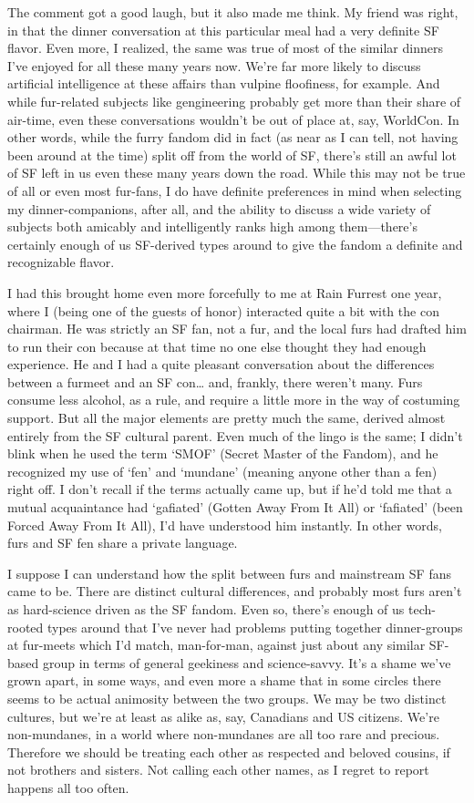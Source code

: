 The comment got a good laugh, but it also made me think. My friend was right, in that the dinner conversation at this particular meal had a very definite SF flavor. Even more, I realized, the same was true of most of the similar dinners I've enjoyed for all these many years now. We're far more likely to discuss artificial intelligence at these affairs than vulpine floofiness, for example. And while fur-related subjects like gengineering probably get more than their share of air-time, even these conversations wouldn't be out of place at, say, WorldCon. In other words, while the furry fandom did in fact (as near as I can tell, not having been around at the time) split off from the world of SF, there's still an awful lot of SF left in us even these many years down the road. While this may not be true of all or even most fur-fans, I do have definite preferences in mind when selecting my dinner-companions, after all, and the ability to discuss a wide variety of subjects both amicably and intelligently ranks high among them—there's certainly enough of us SF-derived types around to give the fandom a definite and recognizable flavor.

I had this brought home even more forcefully to me at Rain Furrest one year, where I (being one of the guests of honor) interacted quite a bit with the con chairman. He was strictly an SF fan, not a fur, and the local furs had drafted him to run their con because at that time no one else thought they had enough experience. He and I had a quite pleasant conversation about the differences between a furmeet and an SF con… and, frankly, there weren't many. Furs consume less alcohol, as a rule, and require a little more in the way of costuming support. But all the major elements are pretty much the same, derived almost entirely from the SF cultural parent. Even much of the lingo is the same; I didn't blink when he used the term `SMOF' (Secret Master of the Fandom), and he recognized my use of `fen' and `mundane' (meaning anyone other than a fen) right off. I don't recall if the terms actually came up, but if he'd told me that a mutual acquaintance had `gafiated' (Gotten Away From It All) or `fafiated' (been Forced Away From It All), I'd have understood him instantly. In other words, furs and SF fen share a private language.

I suppose I can understand how the split between furs and mainstream SF fans came to be. There are distinct cultural differences, and probably most furs aren't as hard-science driven as the SF fandom. Even so, there's enough of us tech-rooted types around that I've never had problems putting together dinner-groups at fur-meets which I'd match, man-for-man, against just about any similar SF-based group in terms of general geekiness and science-savvy. It's a shame we've grown apart, in some ways, and even more a shame that in some circles there seems to be actual animosity between the two groups. We may be two distinct cultures, but we're at least as alike as, say, Canadians and US citizens. We're non-mundanes, in a world where non-mundanes are all too rare and precious. Therefore we should be treating each other as respected and beloved cousins, if not brothers and sisters. Not calling each other names, as I regret to report happens all too often.

